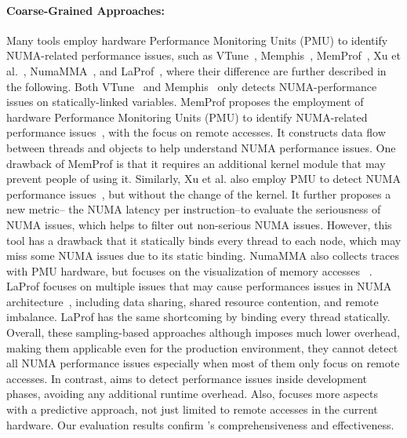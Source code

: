 \paragraph{Coarse-Grained Approaches:}
Many tools employ hardware Performance Monitoring Units (PMU) to identify NUMA-related performance issues, such as VTune~\cite{Intel:VTune}, Memphis~\cite{Memphis}, MemProf~\cite{Lachaize:2012:MMP:2342821.2342826}, Xu et al.~\cite{XuNuma}, NumaMMA~\cite{NumaMMA}, and LaProf~\cite{7847070}, where their difference are further described in the following. 
Both VTune~\cite{Intel:VTune} and Memphis~\cite{Memphis} only detects NUMA-performance issues on statically-linked variables.  
MemProf proposes the employment of hardware Performance Monitoring Units (PMU) to identify NUMA-related performance issues~\cite{Lachaize:2012:MMP:2342821.2342826}, with the focus on remote accesses. It constructs data flow between threads and objects to help understand NUMA performance issues. One drawback of MemProf is that it requires an additional kernel module that may prevent people of using it. Similarly, Xu et al. also employ PMU to detect NUMA performance issues~\cite{XuNuma}, but without the change of the kernel. It further proposes a new metric-- the NUMA latency per instruction--to evaluate the seriousness of NUMA issues, which helps to filter out non-serious NUMA issues. However, this tool has a drawback that it statically binds every thread to each node, which may miss some NUMA issues due to its static binding. 
NumaMMA also collects traces with PMU hardware, but focuses on the visualization of memory accesses ~\cite{NumaMMA}. LaProf focuses on multiple issues that may cause performances issues in NUMA architecture~\cite{7847070}, including data sharing, shared resource contention, and remote imbalance. LaProf has the same shortcoming by binding every thread statically.  Overall, these sampling-based approaches although imposes much lower overhead, making them applicable even for the production environment, they cannot detect all NUMA performance issues especially when most of them only focus on remote accesses. In contrast, \NP{} aims to detect performance issues inside  development phases, avoiding any additional runtime overhead. Also, \NP{} focuses more aspects with a predictive approach, not just limited to remote accesses in the current hardware. Our evaluation results confirm \NP{}'s comprehensiveness and effectiveness. 

